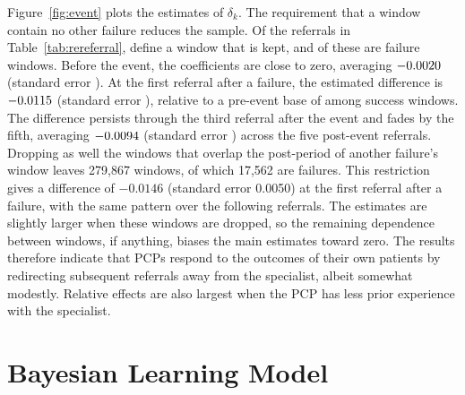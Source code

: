 \documentclass[12pt]{article}
\newcommand{\rereferESEventsSutva}{279,867}
\newcommand{\rereferESFailuresSutva}{17,562}
\newcommand{\rereferESFirstSutva}{-0.0146}
\newcommand{\rereferESFirstSESutva}{0.0050}
\begin{document}
Figure~\ref{fig:event} plots the estimates of $\delta_k$. The requirement that a window contain no other failure reduces the sample. Of the \rereferEvents{} referrals in Table~\ref{tab:rereferral}, \rereferESEvents{} define a window that is kept, and \rereferESFailures{} of these are failure windows. Before the event, the coefficients are close to zero, averaging $-0.0020{}$ (standard error \rereferESPreSE{}). At the first referral after a failure, the estimated difference is $-0.0115{}$ (standard error \rereferESFirstSE{}), relative to a pre-event base of \rereferESBase{} among success windows. The difference persists through the third referral after the event and fades by the fifth, averaging $-0.0094{}$ (standard error \rereferESPostSE{}) across the five post-event referrals. Dropping as well the windows that overlap the post-period of another failure's window leaves \rereferESEventsSutva{} windows, of which \rereferESFailuresSutva{} are failures. This restriction gives a difference of $\rereferESFirstSutva{}$ (standard error \rereferESFirstSESutva{}) at the first referral after a failure, with the same pattern over the following referrals. The estimates are slightly larger when these windows are dropped, so the remaining dependence between windows, if anything, biases the main estimates toward zero. The results therefore indicate that PCPs respond to the outcomes of their own patients by redirecting subsequent referrals away from the specialist, albeit somewhat modestly. Relative effects are also largest when the PCP has less prior experience with the specialist.


\section{Bayesian Learning Model}
\label{sec:model}
\end{document}
